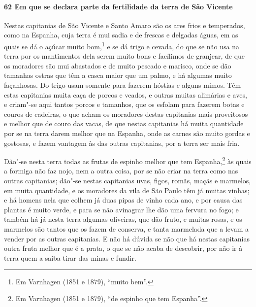 \begin{linenumbers}
\paragraph{62 Em que se declara parte da fertilidade da terra de São Vicente} \quad
Nestas capitanias de São Vicente e Santo Amaro são os ares frios e temperados, como na
Espanha, cuja terra é mui sadia e de frescas e delgadas águas, em as quais se dá o açúcar
muito bom,\footnote{ Em Varnhagen (1851 e 1879), ``muito bem''.} e se dá trigo e cevada,
do que se não usa na terra por os mantimentos dela serem muito bons e facílimos de
granjear, de que os moradores são mui abastados e de muito pescado e marisco, onde se dão
tamanhas ostras que têm a casca maior que um palmo, e há algumas muito façanhosas. Do
trigo usam somente para fazerem hóstias e alguns mimos. Têm estas capitanias muita caça de
porcos e veados, e outras muitas alimárias e aves, e criam"-se aqui tantos porcos e
tamanhos, que os esfolam para fazerem botas e couros de cadeiras, o que acham os moradores
destas capitanias mais proveitosos e melhor que de couro das vacas, de que nestas
capitanias há muita quantidade por se na terra darem melhor que na Espanha, onde as carnes
são muito gordas e gostosas, e fazem vantagem às das outras capitanias, por a terra ser
mais fria.

Dão"-se nesta terra todas as frutas de espinho melhor que tem Espanha,\footnote{ Em
Varnhagen (1851 e 1879), ``de espinho que tem Espanha''.} às quais a formiga não faz nojo,
nem a outra coisa, por se não criar na terra como nas outras capitanias; dão"-se nestas
capitanias uvas, figos, romãs, maçãs e marmelos, em muita quantidade, e os moradores da
vila de São Paulo têm já muitas vinhas; e há homens nela que colhem já duas pipas de vinho
cada ano, e por causa das plantas é muito verde, e para se não avinagrar lhe dão uma
fervura no fogo; e também há já nesta terra algumas oliveiras, que dão fruto, e muitas
rosas, e os marmelos são tantos que os fazem de conserva, e tanta marmelada que a levam a
vender por as outras capitanias. E não há dúvida se não que há nestas capitanias outra
fruta melhor que é a prata, o que se não acaba de descobrir, por não ir à terra quem a
saiba tirar das minas e fundir.


\end{linenumbers}
